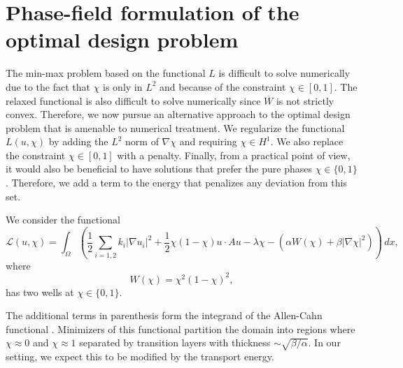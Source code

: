 \documentclass[11pt]{article}
\begin{document}
\section{Phase-field formulation of the optimal design problem} \label{sec:phasefield}

The min-max problem based on the functional $L$ is difficult to solve numerically due to the fact that $\chi$ is only in $L^2$ and because of the constraint $\chi \in [0,1]$. The relaxed functional is also difficult to solve numerically since $\overline W$ is not strictly convex. Therefore, we now pursue an alternative approach to the optimal design problem that is amenable to numerical treatment.  We regularize the functional $L(u,\chi)$ by adding the $L^2$ norm of $ \nabla \chi$ and requiring $\chi \in H^1$. We also replace the constraint $\chi \in [0,1]$ with a penalty. Finally, from a practical point of view, it would also be beneficial to have solutions that prefer the pure phases $\chi \in \{0,1\}$. Therefore, we add a term to the energy that penalizes any deviation from this set.

We consider the functional
$$
\mathcal{L}(u,\chi) = \int_\Omega \left( \frac{1}{2} \sum_{i=1,2} k_i |\nabla u_i|^2 + \frac{1}{2} \chi(1-\chi)u \cdot A u -\lambda\chi - \left( \alpha W(\chi) +\beta |\nabla\chi|^2  \right) \right) \,dx,
$$
where 
$$
W(\chi)= \chi^2(1-\chi)^2,
$$
has two wells at $\chi \in \{0,1\}$.  

The additional terms in parenthesis form the integrand of the Allen-Cahn functional \cite{allencahn}. Minimizers of this functional partition the domain into regions where $\chi \approx 0$ and $\chi \approx 1$ separated by transition layers with thickness $\sim\sqrt{\beta/\alpha}.$ In our setting, we expect this to be modified by the transport energy.
%
\end{document}
